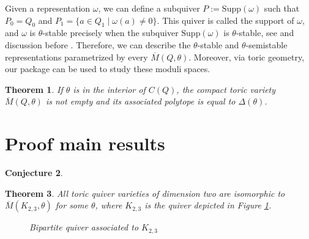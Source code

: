 \documentclass[11pt]{amsart}
\theoremstyle{plain}
\newtheorem{theorem}{Theorem}[section]
\newtheorem{conjecture}[theorem]{Conjecture}
\theoremstyle{definition}
\begin{document}
Given a representation
$ \omega$, we can define a subquiver $P := \text{Supp}(\omega)$ such that $P_0=Q_0$ and  $P_1 = \{ a \in Q_1 \;|\;  \omega(a) \neq 0 \}.$
This quiver is called the support of $\omega$, and $\omega$ is $\theta$-stable precisely when the subquiver 
$\text{Supp}(\omega)$ is $\theta$-stable, 
see  \cite[Lemma 1.4]{Hille1998} and discussion before \cite[Sec 2.2]{Altmann1999}.  Therefore, we can describe the $\theta$-stable and $\theta$-semistable representations parametrized by every $\overline{M}(Q,\theta)$.
 Moreover, via toric geometry, our package can be used to study these moduli spaces.
\begin{theorem}\cite{Hille1998}
If $\theta$ is in the interior of  $C(Q)$, the compact toric variety 
$\overline{M}(Q,\theta)$ is not empty and its associated polytope is 
equal to $\Delta(\theta)$. 
\end{theorem}

\section{Proof main results}

\begin{conjecture}
    
\end{conjecture}


\begin{theorem}\cite{domokos2016equations}
All toric quiver varieties of dimension two are isomorphic to \(\overline{M}(K_{2,3}, \theta)\) for some \(\theta\), where \(K_{2,3}\) is the quiver depicted in Figure \ref{fig:BipartiteQuiverK23}.
\begin{figure}[h!]
\caption{Bipartite quiver associated to $K_{2,3}$}
\label{fig:BipartiteQuiverK23}
\end{figure}
\end{theorem}
\end{document}
